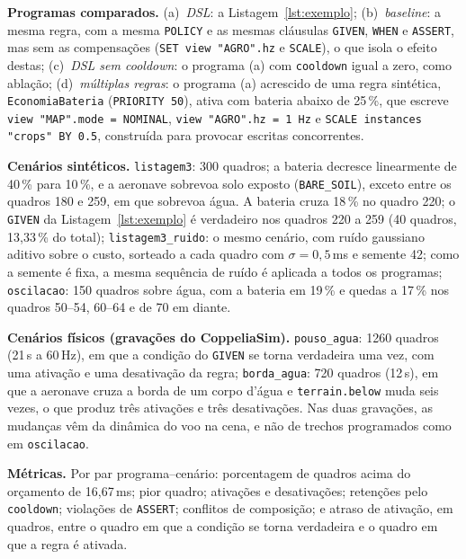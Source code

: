 \documentclass[conference]{IEEEtran}
\begin{document}
\textbf{Programas comparados.}
(a)~\textit{DSL}: a Listagem~\ref{lst:exemplo};
(b)~\textit{baseline}: a mesma regra, com a mesma \texttt{POLICY} e as mesmas
cláusulas \texttt{GIVEN}, \texttt{WHEN} e \texttt{ASSERT}, mas sem as
compensações (\texttt{SET view "AGRO".hz} e \texttt{SCALE}), o que isola o
efeito destas;
(c)~\textit{DSL sem cooldown}: o programa (a) com \texttt{cooldown} igual a
zero, como ablação;
(d)~\textit{múltiplas regras}: o programa (a) acrescido de uma regra sintética,
\texttt{EconomiaBateria} (\texttt{PRIORITY 50}), ativa com bateria abaixo de
25\,\%, que escreve \texttt{view "MAP".mode = NOMINAL},
\texttt{view "AGRO".hz = 1 Hz} e \texttt{SCALE instances "crops" BY 0.5},
construída para provocar escritas concorrentes.

\textbf{Cenários sintéticos.}
\texttt{listagem3}: 300 quadros; a bateria decresce linearmente de 40\,\% para
10\,\%, e a aeronave sobrevoa solo exposto (\texttt{BARE\_SOIL}), exceto entre
os quadros 180 e 259, em que sobrevoa água. A bateria cruza 18\,\% no quadro
220; o \texttt{GIVEN} da Listagem~\ref{lst:exemplo} é verdadeiro nos quadros
220 a 259 (40 quadros, 13,33\,\% do total);
\texttt{listagem3\_ruido}: o mesmo cenário, com ruído gaussiano aditivo sobre o
custo, sorteado a cada quadro com $\sigma = 0{,}5$\,ms e semente 42; como a
semente é fixa, a mesma sequência de ruído é aplicada a todos os programas;
\texttt{oscilacao}: 150 quadros sobre água, com a bateria em 19\,\% e quedas a
17\,\% nos quadros 50--54, 60--64 e de 70 em diante.

\textbf{Cenários físicos (gravações do CoppeliaSim).}
\texttt{pouso\_agua}: 1260 quadros (21\,s a 60\,Hz), em que a condição do
\texttt{GIVEN} se torna verdadeira uma vez, com uma ativação e uma desativação
da regra; \texttt{borda\_agua}: 720 quadros (12\,s), em que a aeronave cruza a
borda de um corpo d'água e \texttt{terrain.below} muda seis vezes, o que produz
três ativações e três desativações. Nas duas gravações, as mudanças vêm da
dinâmica do voo na cena, e não de trechos programados como em
\texttt{oscilacao}.

\textbf{Métricas.} Por par programa--cenário: porcentagem de quadros acima do
orçamento de 16,67\,ms; pior quadro; ativações e desativações; retenções pelo
\texttt{cooldown}; violações de \texttt{ASSERT}; conflitos de composição; e
atraso de ativação, em quadros, entre o quadro em que a condição se torna
verdadeira e o quadro em que a regra é ativada.
\end{document}
